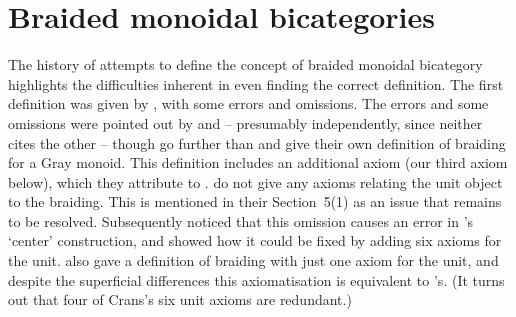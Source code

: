 \documentclass{robinthesisdraft}
\begin{document}
\section{Braided monoidal bicategories}\label{s-braiding}
The history of attempts to define the concept of braided monoidal bicategory highlights
the difficulties inherent in even finding the correct definition. The
first definition was given by \citet{KV}, with some errors and omissions.
The errors and some omissions were pointed out by \citet{CarmodyThesis}
and \citet{HDA1} -- presumably independently, since neither cites the
other -- though \citeauthor{HDA1} go further than \citeauthor{CarmodyThesis}
and give their own definition of braiding for a Gray monoid. This
definition includes an additional axiom (our third axiom below), which they
attribute to \citet{Breen-ator}.
%
 do not give any axioms relating the unit object to the
braiding. This is mentioned in their Section~5(1) as an issue that
remains to be resolved. Subsequently \citet{GeneralizedCenters}
noticed that this omission causes an error in \citeauthor{HDA1}'s
`center' construction, and showed how it could be fixed by adding
six axioms for the unit.  also gave a definition of
braiding with just one axiom for the unit, and despite the superficial
differences this axiomatisation is equivalent to
\citeauthor{GeneralizedCenters}'s. (It turns out that four of Crans's
six unit axioms are redundant.)
\end{document}
